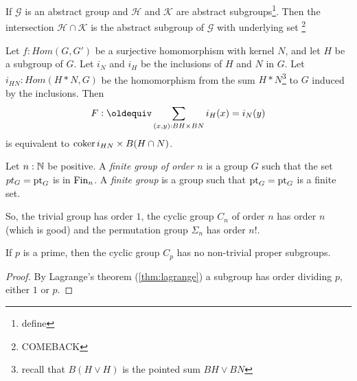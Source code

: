 \begin{xca}
  If $\mathcal G$ is an abstract group and $\mathcal H$ and $\mathcal K$ are abstract subgroups\footnote{define}.  Then the intersection $\mathcal H\cap\mathcal K$ is the abstract subgroup of $\mathcal G$ with underlying set \footnote{COMEBACK}
\end{xca}
\begin{lemma}
  \label{lem:iso2}
  Let $f:Hom(G,G')$ be a surjective homomorphism with kernel $N$, and let $H$ be a subgroup of $G$.  Let $i_N$ and $i_H$ be the inclusions of $H$ and $N$ in $G$.  Let $i_{HN}:Hom(H*N,G)$ be the homomorphism from the sum $H*N$\footnote{recall that $B(H\vee H)$ is the pointed sum $BH\vee BN$} to $G$ induced by the inclusions.  Then 
$$F\defequi \sum_{(x,y):BH\times BN}i_H(x)=i_N(y)$$ is equivalent to $\mathrm{coker}\, i_{HN}\times B(H\cap N)$.
  
\end{lemma}

\begin{definition}
  \label{def:finitegrd}Let $n:\mathbb{N}$ be positive.  
A \emph{finite group of order $n$} is a group $G$ such that the set $pt_G={\mathord{\mathrm{pt}}}_G$ is in $\operatorname{Fin}_n$. 
A \emph{finite group} is a group such that ${\mathord{\mathrm{pt}}}_G={\mathord{\mathrm{pt}}}_G$ is a finite set. 
\end{definition}
So, the trivial group has order $1$, the cyclic group $C_n$ of order $n$ has order $n$ (which is good) and the permutation group $\Sigma_n$ has order $n!$.
    \begin{lemma}
      If $p$ is a prime, then  the cyclic group $C_p$ has no non-trivial proper subgroups.
    \end{lemma}
    \begin{proof}
      By Lagrange's theorem (\cref{thm:lagrange}) a subgroup has order dividing $p$, \ie either $1$ or $p$.
    \end{proof}


